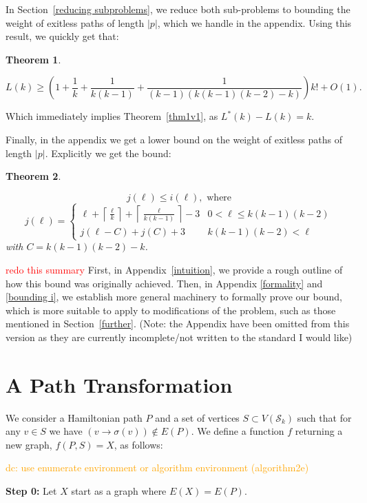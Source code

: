 \documentclass{article}
\newtheorem{thm}{Theorem}
\theoremstyle{definition}
\newcommand{\edit}[1]{\textcolor{red}{#1}}
\newcommand{\dc}[1]{\textcolor{orange}{dc: #1}}
\begin{document}
In Section~\ref{reducing subproblems}, we reduce both sub-problems to bounding the weight of exitless paths of length $|p|$, which we handle in the appendix. Using this result, we quickly get that:

\begin{thm} \label{thm1v2}

\[L(k) \ge \left(1+ \frac{1}{k} + \frac{1}{k(k-1)} + \frac{1}{(k-1)(k(k-1)(k-2)-k)}\right)k! +O(1). \]
\end{thm}\noindent Which immediately implies Theorem~\ref{thm1v1}, as $L^*(k)-L(k) = k$.

Finally, in the appendix we get a lower bound on the weight of exitless paths of length $|p|$. Explicitly we get the bound:

\begin{thm}\label{thm2}

\[j(\ell) \le i(\ell), \text{ where}\]
\[j(\ell) = \begin{cases} 
\ell + \left\lceil \frac{\ell}{k}\right\rceil + \left\lceil \frac{\ell}{k(k-1)}\right\rceil -3 & 0 < \ell \leq k(k-1)(k-2)\\
j(\ell-C) + j(C)+3 & k(k-1)(k-2) < \ell
\end{cases} \]
with $C = k(k-1)(k-2)-k$.\end{thm}

\edit{redo this summary} First, in Appendix~\ref{intuition}, we provide a rough outline of how this bound was originally achieved. Then, in Appendix \ref{formality} and \ref{bounding i}, we establish more general machinery to formally prove our bound, which is more suitable to apply to modifications of the problem, such as those mentioned in Section~\ref{further}. (Note: the Appendix have been omitted from this version as they are currently incomplete/not written to the standard I would like)

\section{A Path Transformation} \label{function}

We consider a Hamiltonian path $P$ and a set of vertices $S\subset V(\mathcal{S}_k)$ such that for any $v \in S$ we have $(v \to \sigma(v)) \not \in E(P)$. We define a function $f$ returning a new graph, $f(P, S)=X$, as follows: 

\vspace{1.75em}\dc{ use enumerate environment or algorithm environment (algorithm2e)}

\textbf{Step 0:} Let $X$ start as a graph where $E(X) = E(P)$.
\end{document}
